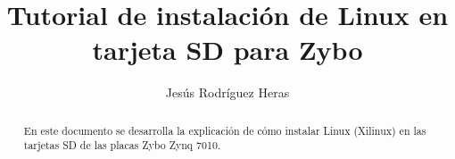 \documentclass[12pt,letterpaper]{article}
\title{Tutorial de instalación de Linux en tarjeta SD para Zybo}
\author{Jesús Rodríguez Heras}
\begin{document}
	
	\maketitle
	\begin{abstract} %
		\begin{center}
			En este documento se desarrolla la explicación de cómo instalar Linux (Xilinux) en las tarjetas SD de las placas Zybo Zynq 7010.
		\end{center}
	\end{abstract}
	\thispagestyle{empty}
	\newpage
	
	\tableofcontents
	\newpage
	
	
	
	
	\lstset{language=bash, numbers=left, numberstyle=\tiny, numbersep=10pt, firstnumber=1, stepnumber=1, basicstyle=\small\ttfamily, tabsize=1, extendedchars=true, inputencoding=latin1}
\end{document}
